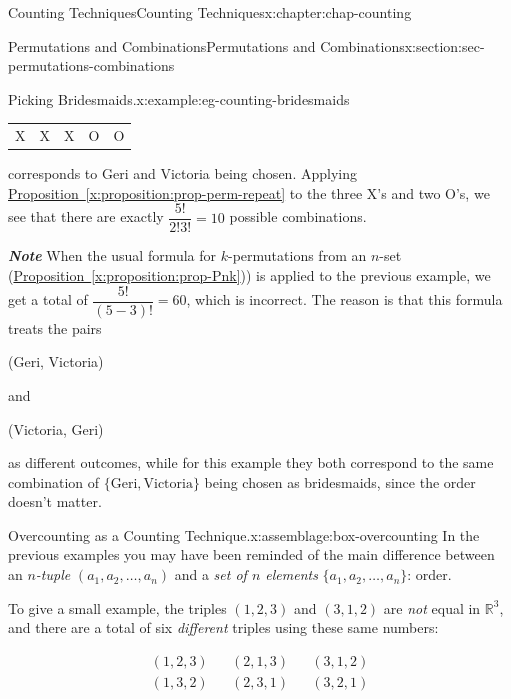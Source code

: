 \documentclass[oneside,10pt,]{book}
\newcommand{\xreffont}{\relax}
\newcommand{\alert}[1]{\textbf{\textit{#1}}}
\numberwithin{equation}{section}
\newcommand{\amp}{&}
\begin{document}
\begin{chapterptx}{Counting Techniques}{}{Counting Techniques}{}{}{x:chapter:chap-counting}
\begin{sectionptx}{Permutations and Combinations}{}{Permutations and Combinations}{}{}{x:section:sec-permutations-combinations}
\begin{example}{Picking Bridesmaids.}{x:example:eg-counting-bridesmaids}
\begin{sidebyside}{1}{0.225}{0.225}{0}
\begin{sbspanel}{0.55}
{{{\begin{tabular}{lllll}
X&X&X&O&O
\end{tabular}
}%
\par}
}%
\end{sbspanel}%
\end{sidebyside}%
\par
corresponds to Geri and Victoria being chosen. Applying \hyperref[x:proposition:prop-perm-repeat]{Proposition~{\xreffont\ref{x:proposition:prop-perm-repeat}}} to the three X's and two O's, we see that there are exactly \(\dfrac{5!}{2! 3!} = 10\) possible combinations.%
\par
\alert{Note} When the usual formula for \(k\)-permutations from an \(n\)-set (\hyperref[x:proposition:prop-Pnk]{Proposition~{\xreffont\ref{x:proposition:prop-Pnk}}})) is applied to the previous example, we get a total of \(\dfrac{5!}{(5-3)!} = 60\), which is incorrect. The reason is that this formula treats the pairs%
\begin{sidebyside}{3}{0.2}{0.2}{0}%
\begin{sbspanel}{0.25}%
(Geri, Victoria)%
\end{sbspanel}%
\begin{sbspanel}{0.1}%
\par
and%
\end{sbspanel}%
\begin{sbspanel}{0.25}%
\par
(Victoria, Geri)%
\end{sbspanel}%
\end{sidebyside}%
\par
as different outcomes, while for this example they both correspond to the same combination of \(\{\text{Geri}, \text{Victoria}\}\) being chosen as bridesmaids, since the order doesn't matter.%
\end{example}
\begin{assemblage}{Overcounting as a Counting Technique.}{x:assemblage:box-overcounting}%
In the previous examples you may have been reminded of the main difference between an \emph{\(n\)-tuple} \((a_1,a_2,\ldots,a_n)\) and a \emph{set of \(n\) elements} \(\{a_1,a_2,\ldots,a_n\}\): order.%
\par
To give a small example, the triples \((1,2,3)\) and \((3,1,2)\) are \emph{not} equal in \(\mathbb{R}^3\), and there are a total of six \emph{different} triples using these same numbers:%
\par
%
\begin{align*}
(1,2,3) \amp \amp (2,1,3) \amp \amp (3,1,2)\\
(1,3,2) \amp \amp (2,3,1) \amp \amp (3,2,1)

\end{align*}
\end{assemblage}
\end{sectionptx}
\end{chapterptx}
\end{document}
